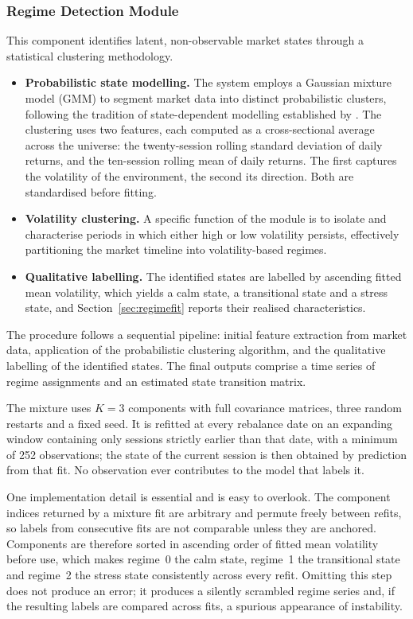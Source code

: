 \subsubsection{Regime Detection Module}

This component identifies latent, non-observable market states through a statistical
clustering methodology.

\begin{itemize}
\item \textbf{Probabilistic state modelling.} The system employs a Gaussian mixture model
(GMM) to segment market data into distinct probabilistic clusters, following the
tradition of state-dependent modelling established by \citet{hamilton89}. The clustering
uses two features, each computed as a cross-sectional average across the universe: the
twenty-session rolling standard deviation of daily returns, and the ten-session rolling
mean of daily returns. The first captures the volatility of the environment, the second
its direction. Both are standardised before fitting.
\item \textbf{Volatility clustering.} A specific function of the module is to isolate and
characterise periods in which either high or low volatility persists, effectively
partitioning the market timeline into volatility-based regimes.
\item \textbf{Qualitative labelling.} The identified states are labelled by ascending
fitted mean volatility, which yields a calm state, a transitional state and a stress
state, and Section~\ref{sec:regimefit} reports their realised characteristics.
\end{itemize}

The procedure follows a sequential pipeline: initial feature extraction from market data,
application of the probabilistic clustering algorithm, and the qualitative labelling of
the identified states. The final outputs comprise a time series of regime assignments and
an estimated state transition matrix.

The mixture uses $K = 3$ components with full covariance matrices, three random restarts
and a fixed seed. It is refitted at every rebalance date on an expanding window
containing only sessions strictly earlier than that date, with a minimum of 252
observations; the state of the current session is then obtained by prediction from that
fit. No observation ever contributes to the model that labels it.

One implementation detail is essential and is easy to overlook. The component indices
returned by a mixture fit are arbitrary and permute freely between refits, so labels from
consecutive fits are not comparable unless they are anchored. Components are therefore
sorted in ascending order of fitted mean volatility before use, which makes regime~0 the
calm state, regime~1 the transitional state and regime~2 the stress state consistently
across every refit. Omitting this step does not produce an error; it produces a silently
scrambled regime series and, if the resulting labels are compared across fits, a spurious
appearance of instability.

